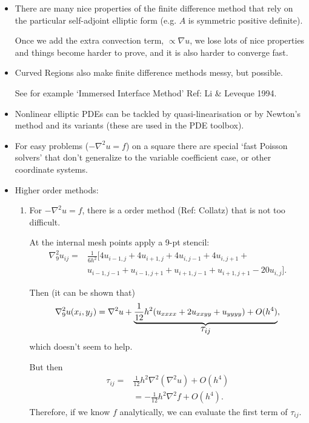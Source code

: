 \documentclass[12pt, a4paper]{article}
\theoremstyle{definition}
\theoremstyle{remark}
\numberwithin{equation}{section}
\begin{document}
\begin{itemize}
\item There are many nice properties of the finite difference method that rely on the particular self-adjoint elliptic form (e.g.  $A$ is symmetric positive definite).

Once we add the extra convection term, $ \propto\nabla u$, we lose lots of nice properties and things become harder to prove, and it is also harder to converge fast.

\item Curved Regions also make finite difference methods messy, but possible. 

See for example  `Immersed Interface Method' Ref: Li \& Leveque 1994.

\item Nonlinear elliptic PDEs can be tackled by  quasi-linearisation or by Newton's method and its variants (these are used in the PDE toolbox).

\item For easy problems ($-\nabla^2u=f$) on a square there are special `fast Poisson solvers' that don't generalize to the variable coefficient case, or other coordinate systems.

\item Higher order methods:
\begin{enumerate}
\item 
For $-\nabla^2u=f$, there is a  order method (Ref: Collatz) that is not too difficult.

At the internal mesh points apply a 9-pt stencil:
\begin{align*}
\nabla^2_9u_{ij}=&\frac{1}{6h^2}[4u_{i-1,j}+4u_{i+1,j}+4u_{i,j-1}+4u_{i,j+1}+\\&u_{i-1,j-1}+u_{i-1,j+1}+u_{i+1,j-1}+u_{i+1,j+1} - 20 u_{i,j}].
\end{align*}


Then (it can be shown that)
\begin{equation*}
\nabla^2_9u(x_i, y_j)=\nabla^2u+\underbrace{\frac{1}{12}h^2(u_{xxxx}+2u_{xxyy}+u_{yyyy})+O(h^4)}_{\mbox{\large$\tau_{ij}$}},
\end{equation*}
which doesn't seem to help. 

But then 
\begin{align*}
\tau_{ij}=& \frac{1}{12}h^2\nabla^2(\nabla^2 u)+O(h^4)\\
&= - \frac{1}{12}h^2\nabla^2f+O(h^4).
\end{align*}
Therefore, if we know $f$ analytically, we can evaluate the first term of $\tau_{ij}$.


\end{enumerate}
\end{itemize}
\end{document}
